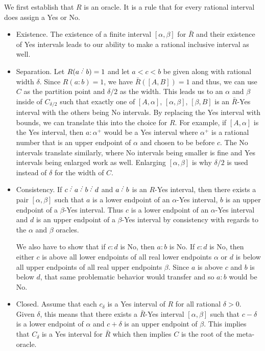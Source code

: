 \documentclass[12pt]{article}
\begin{document}
We first establish that $R$ is an oracle. It is a rule that for every rational interval does assign a Yes or No. 
\begin{itemize}
    \item Existence. The existence of a finite interval $[\alpha, \beta]$ for $\bar{R}$ and their existence of Yes intervals leads to our ability to make a rational inclusive interval as well. 
    
    \item Separation. Let $R(a\lte b) = 1$ and let $a < c < b$ be given along with rational width $\delta$. Since $R(a:b)= 1$, we have $\bar{R}([A, B]) = 1$ and  thus, we can use $C$ as the partition point and $\delta/2$ as the width. This leads us to an $\alpha$ and $\beta$ inside of $C_{\delta/2}$ such that exactly one of $[A,\alpha]$, $[\alpha, \beta]$, $[\beta, B]$ is an $\bar{R}$-Yes interval with the others being No intervals. By replacing the Yes interval with bounds, we can translate this into the choice for $R$. For example, if $[A, \alpha]$ is the Yes interval, then $a:\alpha^+$ would be a Yes interval where $\alpha^+$ is a rational number that is an upper endpoint of $\alpha$ and chosen to be before $c$. The No intervals translate similarly, where No intervals being smaller is fine and Yes intervals being enlarged work as well. Enlarging $[\alpha, \beta]$ is why $\delta/2$ is used instead of $\delta$ for the width of $C$. 

    
    \item Consistency. If $c\lte a \lte b \lte d$ and $a \lte b$ is an $R$-Yes interval, then there exists a pair $[\alpha, \beta]$ such that $a$ is a lower endpoint of an $\alpha$-Yes interval, $b$ is an upper endpoint of a $\beta$-Yes interval. Thus $c$ is a lower endpoint of an $\alpha$-Yes interval and $d$ is an upper endpoint of a $\beta$-Yes interval by consistency with regards to the $\alpha$ and $\beta$ oracles. 
    
    We also have to show that if $c:d$ is No, then $a:b$ is No. If $c:d$ is No, then either $c$ is above all lower endpoints of all real lower endpoints $\alpha$ or $d$ is below all upper endpoints of all real upper endpoints $\beta$. Since $a$ is above $c$ and $b$ is below $d$, that same problematic behavior would transfer and so $a:b$ would be No. 
    
    \item Closed. Assume that each $c_\delta$ is a Yes interval of $R$ for all rational $\delta >0$. Given $\delta$, this means that there exists a $\bar{R}$-Yes interval $[\alpha, \beta]$ such that $c-\delta$ is a lower endpoint of $\alpha$ and $c+\delta$ is an upper endpoint of $\beta$. This implies that $C_\delta$ is a Yes interval for $\bar{R}$ which then implies $C$ is the root of the meta-oracle. 


\end{itemize}
\end{document}
